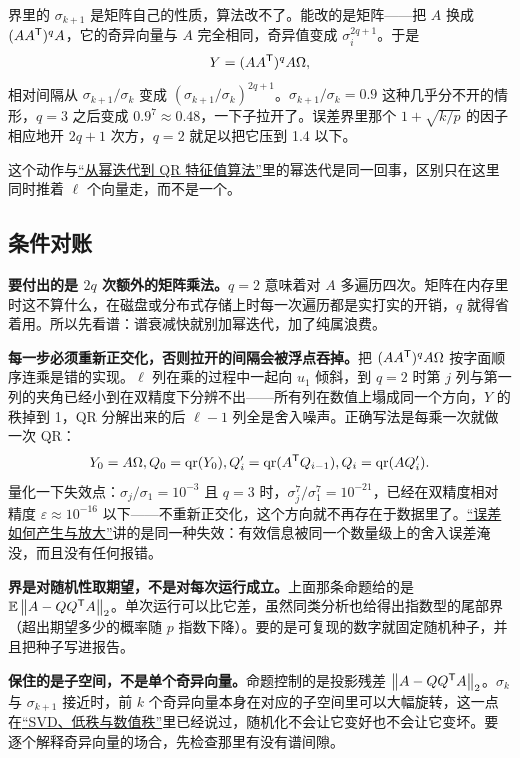 界里的 \(\sigma_{k+1}\) 是矩阵自己的性质，算法改不了。能改的是矩阵——把 \(A\) 换成 \((AA^{\mathsf{T}})^qA\)，它的奇异向量与 \(A\) 完全相同，奇异值变成 \(\sigma_i^{2q+1}\)。于是
\[
Y=(AA^{\mathsf{T}})^qA\Omega ,
\]
相对间隔从 \(\sigma_{k+1}/\sigma_k\) 变成 \((\sigma_{k+1}/\sigma_k)^{2q+1}\)。\(\sigma_{k+1}/\sigma_k=0.9\) 这种几乎分不开的情形，\(q=3\) 之后变成 \(0.9^{7}\approx0.48\)，一下子拉开了。误差界里那个 \(1+\sqrt{k/p}\) 的因子相应地开 \(2q+1\) 次方，\(q=2\) 就足以把它压到 1.4 以下。

这个动作与\hyperref[sec:08-Numerical-Analysis/05-Numerical-Linear-Algebra/05]{``从幂迭代到 QR 特征值算法''}里的幂迭代是同一回事，区别只在这里同时推着 \(\ell\) 个向量走，而不是一个。

\subsection{条件对账}

\textbf{要付出的是 \(2q\) 次额外的矩阵乘法。}\(q=2\) 意味着对 \(A\) 多遍历四次。矩阵在内存里时这不算什么，在磁盘或分布式存储上时每一次遍历都是实打实的开销，\(q\) 就得省着用。所以先看谱：谱衰减快就别加幂迭代，加了纯属浪费。

\textbf{每一步必须重新正交化，否则拉开的间隔会被浮点吞掉。}把 \((AA^{\mathsf{T}})^q A\Omega\) 按字面顺序连乘是错的实现。\(\ell\) 列在乘的过程中一起向 \(u_1\) 倾斜，到 \(q=2\) 时第 \(j\) 列与第一列的夹角已经小到在双精度下分辨不出——所有列在数值上塌成同一个方向，\(Y\) 的秩掉到 1，QR 分解出来的后 \(\ell-1\) 列全是舍入噪声。正确写法是每乘一次就做一次 QR：
\[
Y_0=A\Omega,\space Q_0=\operatorname{qr}(Y_0),\space
Q_i'=\operatorname{qr}(A^{\mathsf{T}}Q_{i-1}),\space Q_i=\operatorname{qr}(AQ_i') .
\]
量化一下失效点：\(\sigma_j/\sigma_1=10^{-3}\) 且 \(q=3\) 时，\(\sigma_j^{7}/\sigma_1^{7}=10^{-21}\)，已经在双精度相对精度 \(\varepsilon\approx10^{-16}\) 以下——不重新正交化，这个方向就不再存在于数据里了。\hyperref[sec:08-Numerical-Analysis/01-Floating-Point-and-Error/02]{``误差如何产生与放大''}讲的是同一种失效：有效信息被同一个数量级上的舍入误差淹没，而且没有任何报错。

\textbf{界是对随机性取期望，不是对每次运行成立。}上面那条命题给的是 \(\mathbb{E}\left\lVert A-QQ^{\mathsf{T}}A\right\rVert_2\)。单次运行可以比它差，虽然同类分析也给得出指数型的尾部界（超出期望多少的概率随 \(p\) 指数下降）。要的是可复现的数字就固定随机种子，并且把种子写进报告。

\textbf{保住的是子空间，不是单个奇异向量。}命题控制的是投影残差 \(\left\lVert A-QQ^{\mathsf{T}}A\right\rVert_2\)。\(\sigma_k\) 与 \(\sigma_{k+1}\) 接近时，前 \(k\) 个奇异向量本身在对应的子空间里可以大幅旋转，这一点在\hyperref[sec:08-Numerical-Analysis/05-Numerical-Linear-Algebra/06]{``SVD、低秩与数值秩''}里已经说过，随机化不会让它变好也不会让它变坏。要逐个解释奇异向量的场合，先检查那里有没有谱间隙。

